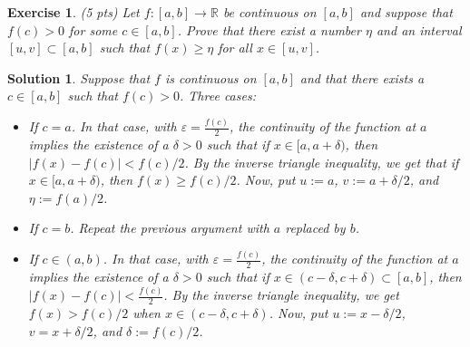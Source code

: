 \documentclass[12pt]{article}
\newcommand{\bR}{\mathbb{R}}
\newcommand{\ra}{\rightarrow}
\theoremstyle{plain}
\newtheorem{exer}{\textbf{Exercise}}}
\theoremstyle{plain}
\newtheorem*{sol}{\textbf{Solution}}}
\theoremstyle{plain}
\theoremstyle{plain}
\begin{document}
\begin{exer}
(5 pts)
Let $f: [a, b] \ra \bR$ be continuous on $[a, b]$ and suppose that $f(c) > 0$ for some $c \in [a, b]$. Prove that there exist a number $\eta$ and an interval $[u, v] \subset [a, b]$ such that $f(x) \geq \eta$ for all $x \in [u, v]$.
\end{exer}
\begin{sol}
Suppose that $f$ is continuous on $[a, b]$ and that there exists a $c \in [a, b]$ such that $f(c) > 0$. Three cases:
	\begin{itemize}
	\item If $c = a$. In that case, with $\varepsilon = \frac{f(c)}{2}$, the continuity of the function at $a$ implies the existence of a $\delta > 0$ such that if $x \in [a, a + \delta )$, then $|f(x) - f(c)| < f(c)/2$. By the inverse triangle inequality, we get that if $x \in [a, a + \delta )$, then $f(x) \geq f(c) /2$. Now, put $u := a$, $v := a + \delta/2$, and $\eta := f(a)/2$.
	\item If $c = b$. Repeat the previous argument with $a$ replaced by $b$.
	\item If $c \in (a, b)$. In that case, with $\varepsilon = \frac{f(c)}{2}$, the continuity of the function at $a$ implies the existence of a $\delta > 0$ such that if $x \in (c - \delta , c + \delta ) \subset [a, b]$, then $|f(x) - f(c)| < \frac{f(c)}{2}$. By the inverse triangle inequality, we get $f(x) > f(c)/2$ when $x \in (c - \delta , c + \delta )$. Now, put $u := x - \delta/2$, $v = x + \delta/2$, and $\delta := f(c)/2$.
	\end{itemize}
\end{sol}
\end{document}
